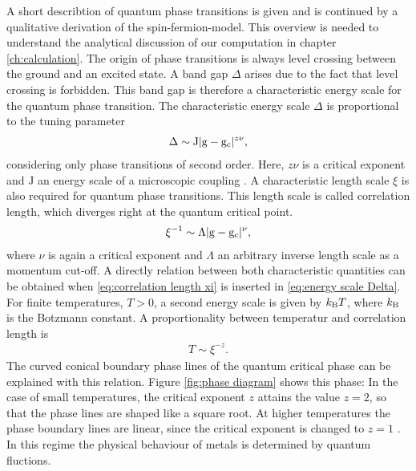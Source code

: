 A short describtion of quantum phase transitions is given and is continued by a qualitative derivation of the spin-fermion-model.
This overview is needed to understand the analytical discussion of our computation in chapter \ref{ch:calculation}.
The origin of phase transitions is always level crossing between the ground and an excited state.
A band gap $\Delta$ arises due to the fact that level crossing is forbidden.
This band gap is therefore a characteristic energy scale for the quantum phase transition.
The characteristic energy scale $\Delta$ is proportional to the tuning parameter
%
\begin{align}
	\Delta \sim \mathrm{J} |\mathrm{g} - \mathrm{g}_{\mathrm{c}}|^{z \nu},
	\label{eq:energy scale Delta}
\end{align}
%
considering only phase transitions of second order.
Here, $z\nu$ is a critical exponent and J an energy scale of a microscopic coupling \cite{SachdevQCP}.
A characteristic length scale $\xi$ is also required for quantum phase transitions.
This length scale is called correlation length, which diverges right at the quantum critical point.
%
\begin{align}
	\xi^{-1} \sim \Lambda |\mathrm{g} - \mathrm{g}_{\mathrm{c}}|^{\nu},
	\label{eq:correlation length xi}
\end{align}
%
where $\nu$ is again a critical exponent and $\Lambda$ an arbitrary inverse length scale as a momentum cut-off.
A directly relation between both characteristic quantities can be obtained when \eqref{eq:correlation length xi} is inserted in \eqref{eq:energy scale Delta}.
For finite temperatures, $T > 0$, a second energy scale is given by $k_{\mathrm{B}} T$, where $k_{\mathrm{B}}$ is the Botzmann constant.
A proportionality between temperatur and correlation length is
%
\begin{align}
	T \sim \xi^{-z}.
	\label{relation temperature and correlation length}
\end{align}
%
The curved conical boundary phase lines of the quantum critical phase can be explained with this relation.
Figure \ref{fig:phase diagram} shows this phase: In the case of small temperatures, the critical exponent $z$ attains the value $z = 2$, so that the phase lines are shaped like a square root.
At higher temperatures the phase boundary lines are linear, since the critical exponent is changed to $z = 1$ \cite{Patel&Sachdev}. 
In this regime the physical behaviour of metals is determined by quantum fluctions.

